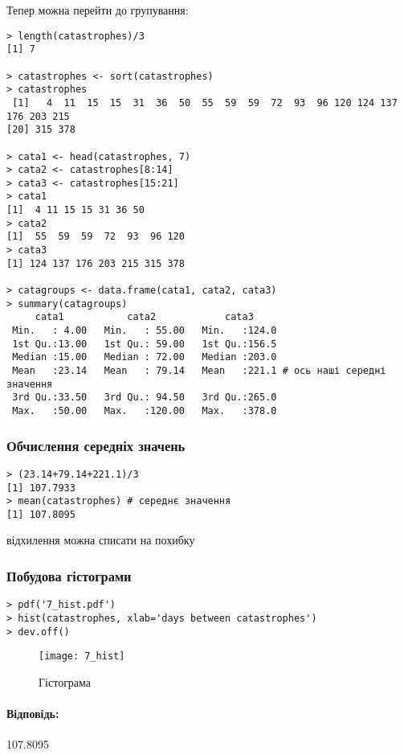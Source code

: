 \documentclass[a4paper, 12pt, oneside]{extarticle}
\newcommand{\Problem}{\subsection}
\newcommand{\Answer}[1]{
\medskip
\null\hfill
\begin{boxedminipage}{\textwidth}
	\paragraph{Відповідь: }{#1}
\end{boxedminipage}
}
\begin{document}
Тепер можна перейти до групування:
\begin{verbatim}
> length(catastrophes)/3
[1] 7

> catastrophes <- sort(catastrophes)
> catastrophes
 [1]   4  11  15  15  31  36  50  55  59  59  72  93  96 120 124 137 176 203 215
[20] 315 378

> cata1 <- head(catastrophes, 7)
> cata2 <- catastrophes[8:14]
> cata3 <- catastrophes[15:21]
> cata1
[1]  4 11 15 15 31 36 50
> cata2
[1]  55  59  59  72  93  96 120
> cata3
[1] 124 137 176 203 215 315 378

> catagroups <- data.frame(cata1, cata2, cata3)
> summary(catagroups)
     cata1           cata2            cata3
 Min.   : 4.00   Min.   : 55.00   Min.   :124.0
 1st Qu.:13.00   1st Qu.: 59.00   1st Qu.:156.5
 Median :15.00   Median : 72.00   Median :203.0
 Mean   :23.14   Mean   : 79.14   Mean   :221.1 # ось наші середні значення
 3rd Qu.:33.50   3rd Qu.: 94.50   3rd Qu.:265.0
 Max.   :50.00   Max.   :120.00   Max.   :378.0
\end{verbatim}

\subsubsection{Обчислення середніх значень}
\begin{verbatim}
> (23.14+79.14+221.1)/3
[1] 107.7933
> mean(catastrophes) # середнє значення
[1] 107.8095
\end{verbatim}
відхилення можна списати на похибку

\subsubsection{Побудова гістограми}

\begin{verbatim}
> pdf('7_hist.pdf')
> hist(catastrophes, xlab='days between catastrophes')
> dev.off()
\end{verbatim}

\begin{figure}[h]
	\centering
	\texttt{[image: 7\_hist]}
	\caption{Гістограма}
\end{figure}

\Answer{
	107.8095
}

\end{document}
